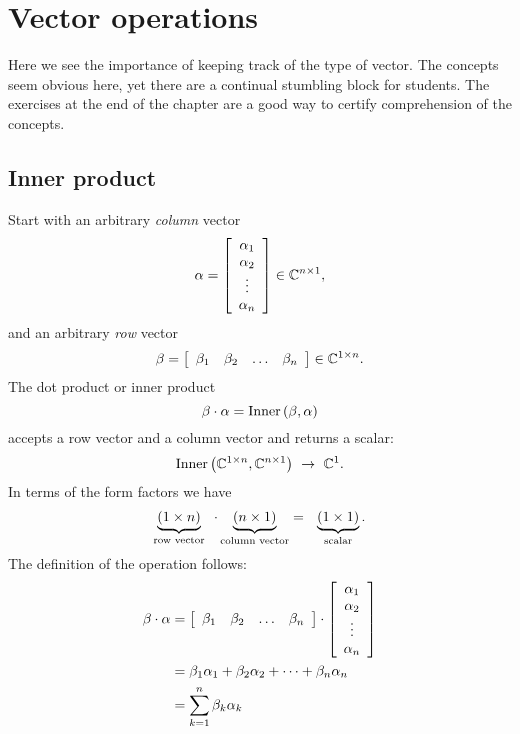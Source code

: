 \section{Vector operations}
Here we see the importance of keeping track of the type of vector. The concepts seem obvious here, yet there are a continual stumbling block for students. The exercises at the end of the chapter are a good way to certify comprehension of the concepts.

\subsection{Inner product}
Start with an arbitrary \textit{column} vector
\begin{equation*}
  \alpha = \mat{c}{\alpha_{1}\\\alpha_{2}\\\vdots\\\alpha_{n}}\in \cmplx{\by{n}{1}},
\end{equation*}
and an arbitrary \textit{row} vector 
\begin{equation*}
  \beta = \mat{cccc}{\beta_{1} & \beta_{2} & \hdots & \beta_{n}}\in \cmplx{\by{1}{n}}.
\end{equation*}
The dot product or inner product 
\begin{equation}
  \beta\cdot\alpha = \text{Inner}\paren{\beta,\alpha}
\end{equation}
accepts a row vector and a column vector and returns a scalar:
\begin{equation}
  \text{Inner}\paren{\cmplx{1\times n},\cmplx{n\times 1}}\ \to \  \cmplx{1}.
\end{equation}
In terms of the form factors we have
\begin{equation}
\underbrace{\paren{\by{1}{n}}}_{\text{row vector}}\ \,\cdot \underbrace{\paren{\by{n}{1}}}_{\text{column vector}}=\ \ \underbrace{\paren{\by{1}{1}}}_{\text{scalar}}.
\end{equation}
The definition of the operation follows:
\begin{equation}
  \begin{split}
    \beta \cdot \alpha &= \mat{cccc}{\beta_{1}&\beta_{2}&\dots&\beta_{n}} \cdot \mat{c}{\alpha_{1}\\\alpha_{2}\\\vdots\\\alpha_{n}}\\
    &= \beta_{1}\alpha_{1} + \beta_{2}\alpha_{2} + \dots + \beta_{n}\alpha_{n}\\
    &= \sum_{k=1}^{n}{\beta_{k}\alpha_{k}}
  \end{split}
\end{equation}

